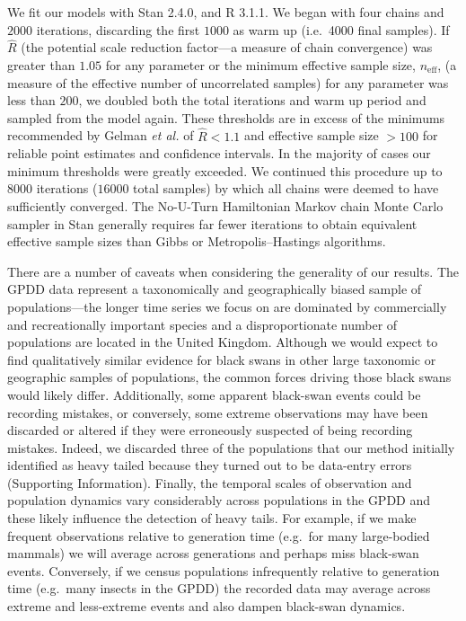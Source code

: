 We fit our models with Stan 2.4.0\cite{stan-manual2014}, and R 3.1.1\cite{r2014}. We began with four chains and \(2000\) iterations, discarding the first \(1000\) as warm up (i.e.~4000 final samples). If \(\hat{R}\) (the potential scale reduction factor---a measure of chain convergence) was greater than \(1.05\) for any parameter or the minimum effective sample size, \(n_\mathrm{eff}\), (a measure of the effective number of uncorrelated samples) for any parameter was less than \(200\), we doubled both the total iterations and warm up period and sampled from the model again. These thresholds are in excess of the minimums recommended by Gelman \emph{et al.}\cite{gelman2006a} of \(\hat{R} < 1.1\) and effective sample size \(> 100\) for reliable point estimates and confidence intervals. In the majority of cases our minimum thresholds were greatly exceeded. We continued this procedure up to \(8000\) iterations (\(16000\) total samples) by which all chains were deemed to have sufficiently converged. The No-U-Turn Hamiltonian Markov chain Monte Carlo sampler in Stan generally requires far fewer iterations to obtain equivalent effective sample sizes than Gibbs or Metropolis--Hastings algorithms\cite{stan-manual2014}.

There are a number of caveats when considering the generality of our results. The GPDD data represent a taxonomically and geographically biased sample of populations---the longer time series we focus on are dominated by commercially and recreationally important species and a disproportionate number of populations are located in the United Kingdom. Although we would expect to find qualitatively similar evidence for black swans in other large taxonomic or geographic samples of populations, the common forces driving those black swans would likely differ. Additionally, some apparent black-swan events could be recording mistakes, or conversely, some extreme observations may have been discarded or altered if they were erroneously suspected of being recording mistakes. Indeed, we discarded three of the populations that our method initially identified as heavy tailed because they turned out to be data-entry errors (Supporting Information). Finally, the temporal scales of observation and population dynamics vary considerably across populations in the GPDD and these likely influence the detection of heavy tails. For example, if we make frequent observations relative to generation time (e.g.~for many large-bodied mammals) we will average across generations and perhaps miss black-swan events. Conversely, if we census populations infrequently relative to generation time (e.g.~many insects in the GPDD) the recorded data may average across extreme and less-extreme events and also dampen black-swan dynamics.

